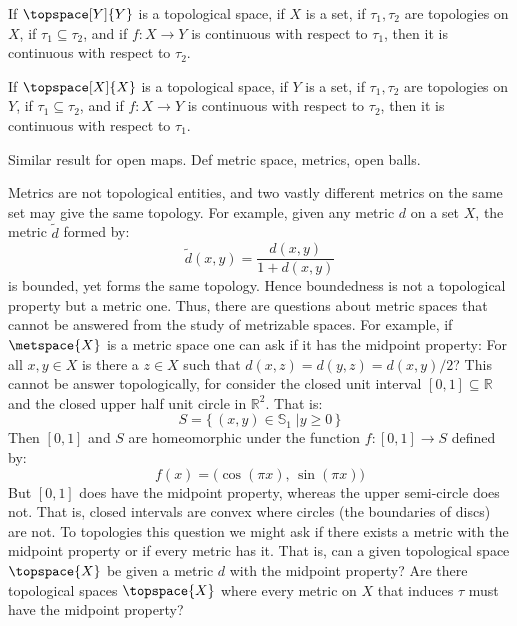 \documentclass{article}                                                        %
\begin{document}
        \begin{theorem}
            If $\topspace[Y]{Y}$ is a topological space, if $X$ is a set, if
            $\tau_{1},\tau_{2}$ are topologies on $X$, if
            $\tau_{1}\subseteq\tau_{2}$, and if $f:X\rightarrow{Y}$ is
            continuous with respect to $\tau_{1}$, then it is continuous with
            respect to $\tau_{2}$.
        \end{theorem}
        \begin{theorem}
            If $\topspace[X]{X}$ is a topological space, if $Y$ is a set, if
            $\tau_{1},\tau_{2}$ are topologies on $Y$, if
            $\tau_{1}\subseteq\tau_{2}$, and if $f:X\rightarrow{Y}$ is
            continuous with respect to $\tau_{2}$, then it is continuous with
            respect to $\tau_{1}$.
        \end{theorem}
        Similar result for open maps. Def metric space, metrics, open balls.
        \begin{example}
            Metrics are not topological entities, and two vastly different
            metrics on the same set may give the same topology. For example,
            given any metric $d$ on a set $X$, the metric $\tilde{d}$ formed by:
            \begin{equation}
                \tilde{d}(x,y)=\frac{d(x,y)}{1+d(x,y)}
            \end{equation}
            is bounded, yet forms the same topology. Hence boundedness is not a
            topological property but a metric one. Thus, there are questions
            about metric spaces that cannot be answered from the study of
            metrizable spaces. For example, if $\metspace{X}$ is a metric space
            one can ask if it has the midpoint property: For all $x,y\in{X}$
            is there a $z\in{X}$ such that $d(x,z)=d(y,z)=d(x,y)/2$? This cannot
            be answer topologically, for consider the closed unit interval
            $[0,1]\subseteq\mathbb{R}$ and the closed upper half unit circle in
            $\mathbb{R}^{2}$. That is:
            \begin{equation}
                S=\{\,(x,y)\in\mathbb{S}_{1}\;|y\geq{0}\,\}
            \end{equation}
            Then $[0,1]$ and $S$ are homeomorphic under the function
            $f:[0,1]\rightarrow{S}$ defined by:
            \begin{equation}
                f(x)=\big(\cos(\pi{x}),\,\sin(\pi{x})\big)
            \end{equation}
            But $[0,1]$ does have the midpoint property, whereas the upper
            semi-circle does not. That is, closed intervals are convex where
            circles (the boundaries of discs) are not. To topologies this
            question we might ask if there exists a metric with the midpoint
            property or if every metric has it. That is, can a given topological
            space $\topspace{X}$ be given a metric $d$ with the midpoint
            property? Are there topological spaces $\topspace{X}$ where every
            metric on $X$ that induces $\tau$ must have the midpoint property?
        \end{example}
\end{document}
